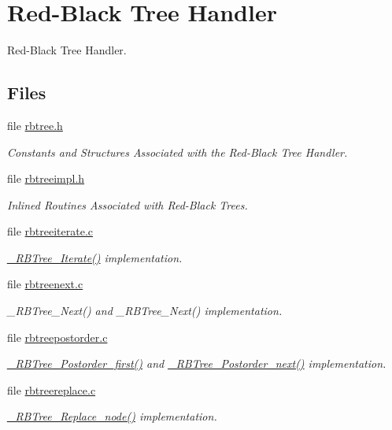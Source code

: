 \hypertarget{group__RTEMSScoreRBTree}{}\section{Red-\/\+Black Tree Handler}
\label{group__RTEMSScoreRBTree}


Red-\/\+Black Tree Handler.  


\subsection*{Files}
\begin{DoxyCompactItemize}
\item 
file \mbox{\hyperlink{rtems_2score_2rbtree_8h}{rbtree.\+h}}
\begin{DoxyCompactList}\small\item\em Constants and Structures Associated with the Red-\/\+Black Tree Handler. \end{DoxyCompactList}\item 
file \mbox{\hyperlink{rbtreeimpl_8h}{rbtreeimpl.\+h}}
\begin{DoxyCompactList}\small\item\em Inlined Routines Associated with Red-\/\+Black Trees. \end{DoxyCompactList}\item 
file \mbox{\hyperlink{rbtreeiterate_8c}{rbtreeiterate.\+c}}
\begin{DoxyCompactList}\small\item\em \mbox{\hyperlink{group__RTEMSScoreRBTree_ga84900b1947f50a5fe6e67234007c5c36}{\+\_\+\+R\+B\+Tree\+\_\+\+Iterate()}} implementation. \end{DoxyCompactList}\item 
file \mbox{\hyperlink{rbtreenext_8c}{rbtreenext.\+c}}
\begin{DoxyCompactList}\small\item\em \+\_\+\+R\+B\+Tree\+\_\+\+Next() and \+\_\+\+R\+B\+Tree\+\_\+\+Next() implementation. \end{DoxyCompactList}\item 
file \mbox{\hyperlink{rbtreepostorder_8c}{rbtreepostorder.\+c}}
\begin{DoxyCompactList}\small\item\em \mbox{\hyperlink{group__RTEMSScoreRBTree_ga35988f7d76f4cbc30fa90df30993cdf7}{\+\_\+\+R\+B\+Tree\+\_\+\+Postorder\+\_\+first()}} and \mbox{\hyperlink{group__RTEMSScoreRBTree_ga98dcfd6daa73d5c6ba3b159a3816cc91}{\+\_\+\+R\+B\+Tree\+\_\+\+Postorder\+\_\+next()}} implementation. \end{DoxyCompactList}\item 
file \mbox{\hyperlink{rbtreereplace_8c}{rbtreereplace.\+c}}
\begin{DoxyCompactList}\small\item\em \mbox{\hyperlink{group__RTEMSScoreRBTree_gac0ebf997d5cc78686db8cd65c3111299}{\+\_\+\+R\+B\+Tree\+\_\+\+Replace\+\_\+node()}} implementation. \end{DoxyCompactList}\end{DoxyCompactItemize}
